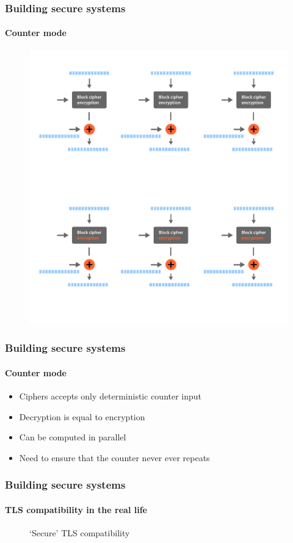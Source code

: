 \documentclass[12pt,t]{beamer}
\begin{document}
\begin{frame}[fragile]
\frametitle{Building secure systems}
\framesubtitle{Counter mode}
\begin{figure}[H]
\includegraphics[height=0.85\textheight]{ctr.pdf}
\end{figure}
\end{frame}

\begin{frame}
\frametitle{Building secure systems}
\framesubtitle{Counter mode}
\begin{itemize}
\item Ciphers accepts only deterministic counter input
\item Decryption is equal to encryption
\item Can be computed in parallel
\item Need to ensure that the counter never ever repeats
\end{itemize}
\end{frame}

\begin{frame}
\frametitle{Building secure systems}
\framesubtitle{TLS compatibility in the real life}
\begin{figure}[H]
\caption{`Secure' TLS compatibility}
\end{figure}
\end{frame}
\end{document}
